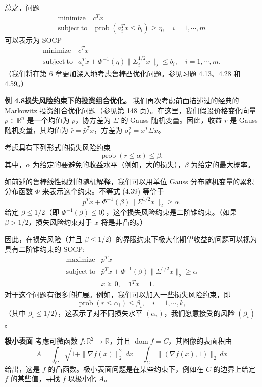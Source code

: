 \documentclass[UTF8, 12pt, fontset=fandol, oneside]{ctexart}
\begin{document}
总之，问题
\[
\begin{array}{ll}
\mathop{\mathrm{minimize}} & c^Tx\\
\mathrm{subject\ to} & \operatorname{prob}(a_i^Tx\leq b_i)\geq \eta,\quad i=1,\cdots,m
\end{array}
\]
可以表示为 SOCP
\[
\begin{array}{ll}
\mathop{\mathrm{minimize}} & c^Tx\\
\mathrm{subject\ to} & \bar a_i^Tx+\Phi^{-1}(\eta)\|\Sigma_i^{1/2}x\|_2\leq b_i,\quad i=1,\cdots,m.
\end{array}
\]
（我们将在第 6 章更加深入地考虑鲁棒凸优化问题。参见习题 4.13、4.28 和 4.59。）

\noindent\textbf{例 4.8\quad 损失风险约束下的投资组合优化。}\quad
我们再次考虑前面描述过的经典的 Markowitz 投资组合优化问题（参见第 148 页）。在这里，我们假设价格变化向量 $p\in\mathbb{R}^n$ 是一个均值为 $\bar p$，协方差为 $\Sigma$ 的 Gauss 随机变量。因此，收益 $r$ 是 Gauss 随机变量，其均值为 $\bar r=\bar p^Tx$，方差为 $\sigma_r^2=x^T\Sigma x$。

考虑具有下列形式的损失风险约束
\begin{equation}
\operatorname{prob}(r\leq \alpha)\leq \beta,
\tag{4.39}
\end{equation}
其中，$\alpha$ 为给定的要避免的收益水平（例如，大的损失），$\beta$ 为给定的最大概率。

如前述的鲁棒线性规划的随机解释，我们可以用单位 Gauss 分布随机变量的累积分布函数 $\Phi$ 来表示这个约束。不等式 (4.39) 等价于
\[
\bar p^Tx+\Phi^{-1}(\beta)\|\Sigma^{1/2}x\|_2\geq \alpha.
\]
给定 $\beta\leq 1/2$（即 $\Phi^{-1}(\beta)\leq 0$），这个损失风险约束是二阶锥约束。（如果 $\beta>1/2$，损失风险约束对于 $x$ 将是非凸的。）

因此，在损失风险（并且 $\beta\leq 1/2$）的界限约束下极大化期望收益的问题可以视为具有二阶锥约束的 SOCP:
\[
\begin{array}{ll}
\mathop{\mathrm{maximize}} & \bar p^Tx\\
\mathrm{subject\ to} & \bar p^Tx+\Phi^{-1}(\beta)\|\Sigma^{1/2}x\|_2\geq \alpha\\
& x\succeq 0,\quad \mathbf{1}^Tx=1.
\end{array}
\]
对于这个问题有很多的扩展。例如，我们可以加入一些损失风险约束，即
\[
\operatorname{prob}(r\leq \alpha_i)\leq \beta_i,\quad i=1,\cdots,k,
\]
（其中 $\beta_i\leq 1/2$），这表示了对不同损失水平 $(\alpha_i)$，我们愿意接受的风险 $(\beta_i)$。

\noindent\textbf{极小表面}\quad
考虑可微函数 $f:\mathbb{R}^2\to\mathbb{R}$，并且 $\operatorname{dom}f=C$，其图像的表面积由
\[
A=\int_C\sqrt{1+\|\nabla f(x)\|_2^2}\,dx=\int_C\|(\nabla f(x),1)\|_2\,dx
\]
给出，这是 $f$ 的凸函数。极小表面问题是在某些约束下，例如在 $C$ 的边界上给定 $f$ 的某些值，寻找 $f$ 以极小化 $A$。
\end{document}
